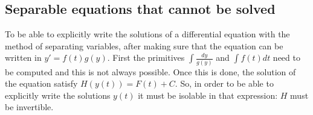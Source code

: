 	\subsection{Separable equations that cannot be solved}
	To be able to explicitly write the solutions of a differential equation with the method of separating variables, after making sure that the equation can be written in $y' = f(t)g(y)$.
	First the primitives $\int\frac{dy}{g(y)}$ and $\int f(t)dt$ need to be computed and this is not always possible.
	Once this is done, the solution of the equation satisfy $H(y(t)) = F(t)+C$.
	So, in order to be able to explicitly write the solutions $y(t)$ it must be isolable in that expression: $H$ must be invertible.
